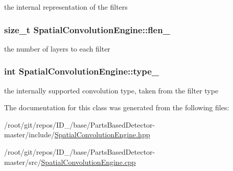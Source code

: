 the internal representation of the filters 

\hypertarget{classSpatialConvolutionEngine_a5d58b30ec6846ef7ccf98f980d4fc957}{
\subsubsection[{flen\-\_\-}]{\setlength{\rightskip}{0pt plus 5cm}size\-\_\-t {\bf \-Spatial\-Convolution\-Engine\-::flen\-\_\-}}}\label{classSpatialConvolutionEngine_a5d58b30ec6846ef7ccf98f980d4fc957}


the number of layers to each filter 

\hypertarget{classSpatialConvolutionEngine_a913adab567840b6d1b2407c3b22ca108}{
\subsubsection[{type\-\_\-}]{\setlength{\rightskip}{0pt plus 5cm}int {\bf \-Spatial\-Convolution\-Engine\-::type\-\_\-}}}\label{classSpatialConvolutionEngine_a913adab567840b6d1b2407c3b22ca108}


the internally supported convolution type, taken from the filter type 



\-The documentation for this class was generated from the following files\-:\begin{DoxyCompactItemize}
\item 
/root/git/repos/\-I\-D\-\_/base/\-Parts\-Based\-Detector-\/master/include/\hyperlink{SpatialConvolutionEngine_8hpp}{\-Spatial\-Convolution\-Engine.\-hpp}\item 
/root/git/repos/\-I\-D\-\_/base/\-Parts\-Based\-Detector-\/master/src/\hyperlink{SpatialConvolutionEngine_8cpp}{\-Spatial\-Convolution\-Engine.\-cpp}\end{DoxyCompactItemize}
